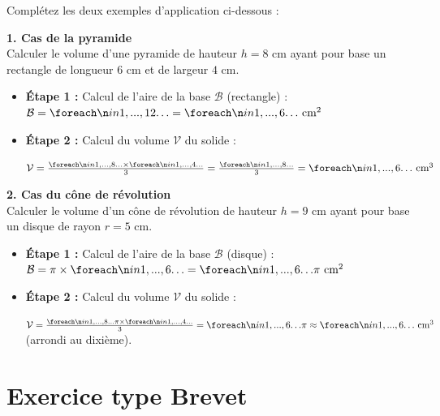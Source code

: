 \documentclass[a4paper]{book}
\begin{document}
    \begin{exemple}
    Complétez les deux exemples d'application ci-dessous :
    
    \vspace{0.2cm}
    \textbf{1. Cas de la pyramide} \\
    Calculer le volume d'une pyramide de hauteur $h = 8\text{ cm}$ ayant pour base un rectangle de longueur $6\text{ cm}$ et de largeur $4\text{ cm}$.
    \begin{itemize}
        \item[$\bullet$] \textbf{Étape 1 :} Calcul de l'aire de la base $\mathcal{B}$ (rectangle) : \\
        $\mathcal{B} = \points[12] = \points[6]\text{ cm}^2$
        \item[$\bullet$] \textbf{Étape 2 :} Calcul du volume $\mathcal{V}$ du solide : \\
        \rule{0pt}{25pt}$\mathcal{V} = \frac{\points[8] \times \points[4]}{3} = \frac{\points[8]}{3} = \points[6]\text{ cm}^3$
    \end{itemize}
    
    \vspace{0.4cm}
    
    \textbf{2. Cas du cône de révolution} \\
    Calculer le volume d'un cône de révolution de hauteur $h = 9\text{ cm}$ ayant pour base un disque de rayon $r = 5\text{ cm}$.
    \begin{itemize}
        \item[$\bullet$] \textbf{Étape 1 :} Calcul de l'aire de la base $\mathcal{B}$ (disque) : \\
        $\mathcal{B} = \pi \times \points[6] = \points[6]\pi\text{ cm}^2$
        \item[$\bullet$] \textbf{Étape 2 :} Calcul du volume $\mathcal{V}$ du solide : \\
        \rule{0pt}{25pt}$\mathcal{V} = \frac{\points[8]\pi \times \points[4]}{3} = \points[6]\pi \approx \points[6]\text{ cm}^3$ (arrondi au dixième).
    \end{itemize}
    \end{exemple}

\section{Exercice type Brevet}
\end{document}
